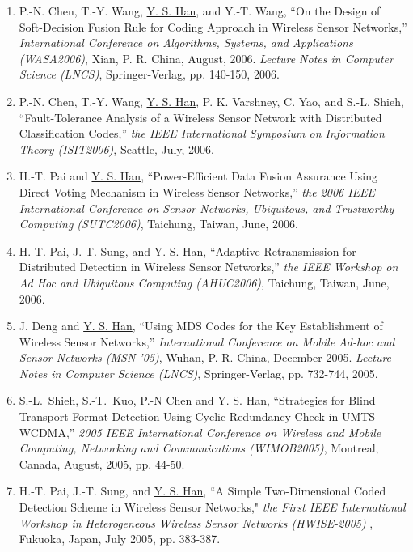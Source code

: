 \begin{llist}
\begin{itemize}
\begin{enumerate}
\item P.-N. Chen, T.-Y. Wang, \underline{Y. S. Han}, and Y.-T. Wang, ``On the
Design of Soft-Decision Fusion Rule for Coding Approach in Wireless
Sensor Networks,'' {\it International Conference on Algorithms,
Systems, and Applications (WASA2006)}, Xian, P. R. China, August,
2006. {\it Lecture Notes in Computer Science (LNCS)},
Springer-Verlag, pp. 140-150, 2006.

\item P.-N. Chen, T.-Y. Wang, \underline{Y. S. Han}, P. K. Varshney, C. Yao,
and S.-L. Shieh, ``Fault-Tolerance Analysis of a Wireless Sensor
Network with Distributed Classification Codes,'' {\it the IEEE
International Symposium on Information Theory (ISIT2006)}, Seattle,
July, 2006.


\item  H.-T. Pai and \underline{Y. S. Han}, ``Power-Efficient Data Fusion
Assurance Using Direct Voting Mechanism in Wireless Sensor
Networks,'' {\it the 2006 IEEE International Conference on Sensor
Networks, Ubiquitous, and Trustworthy Computing (SUTC2006)},
Taichung, Taiwan, June, 2006.

\item  H.-T. Pai, J.-T. Sung, and \underline{Y. S. Han}, ``Adaptive
Retransmission for Distributed Detection in Wireless Sensor
Networks,'' {\it the IEEE Workshop on Ad Hoc and Ubiquitous
Computing (AHUC2006)}, Taichung, Taiwan, June, 2006.

\item J. Deng and \underline{Y. S. Han}, ``Using MDS Codes for
the Key Establishment of Wireless Sensor Networks,'' {\it
International Conference on Mobile Ad-hoc and Sensor Networks (MSN
'05)}, Wuhan, P. R. China, December  2005. {\it Lecture Notes in
Computer Science (LNCS)}, Springer-Verlag, pp. 732-744, 2005.


\item  S.-L.~Shieh, S.-T.~Kuo, P.-N Chen and \underline{Y. S.
Han}, ``Strategies for Blind Transport Format Detection Using Cyclic
Redundancy Check in UMTS WCDMA,'' {\it 2005 IEEE International
Conference on Wireless and Mobile Computing, Networking and
Communications (WIMOB2005)}, Montreal, Canada, August, 2005, pp.
44-50.

\item H.-T. Pai, J.-T. Sung, and \underline{Y.  S. Han}, ``A
Simple Two-Dimensional Coded Detection Scheme in Wireless Sensor
Networks," {\it the First IEEE International Workshop in
Heterogeneous Wireless Sensor Networks (HWISE-2005) }, Fukuoka,
Japan, July 2005, pp. 383-387.



\end{enumerate}
\end{itemize}
\end{llist}
